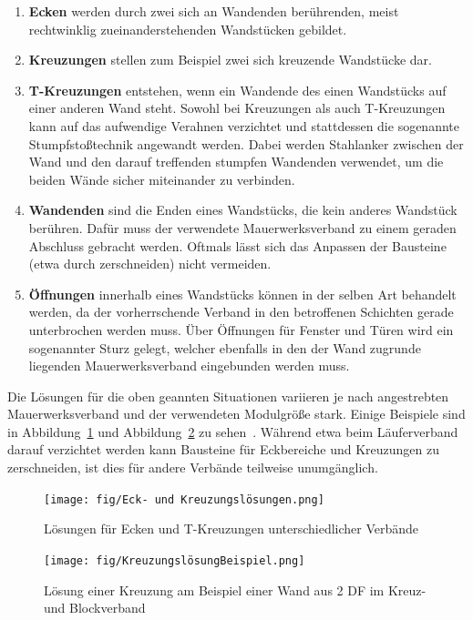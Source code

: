 \begin{enumerate}
  \item \textbf{Ecken} werden durch zwei sich an Wandenden berührenden, meist rechtwinklig zueinanderstehenden Wandstücken gebildet.
  \item \textbf{Kreuzungen} stellen zum Beispiel zwei sich kreuzende Wandstücke dar.
  \item \textbf{T-Kreuzungen} entstehen, wenn ein Wandende des einen Wandstücks auf einer anderen Wand steht.
  Sowohl bei Kreuzungen als auch T-Kreuzungen kann auf das aufwendige Verahnen verzichtet und stattdessen die sogenannte Stumpfstoßtechnik angewandt werden.
  Dabei werden Stahlanker zwischen der Wand und den darauf treffenden \glqq{}stumpfen\grqq{} Wandenden verwendet, um die beiden Wände sicher miteinander zu verbinden.
  \item \textbf{Wandenden} sind die \glqq{}Enden\grqq{} eines Wandstücks, die kein anderes Wandstück berühren.
  Dafür muss der verwendete Mauerwerksverband zu einem geraden Abschluss gebracht werden.
  Oftmals lässt sich das Anpassen der Bausteine (etwa durch zerschneiden) nicht vermeiden.
  \item \textbf{Öffnungen} innerhalb eines Wandstücks können in der selben Art behandelt werden, da der vorherrschende Verband in den betroffenen Schichten gerade unterbrochen werden muss.
  Über Öffnungen für Fenster und Türen wird ein sogenannter Sturz gelegt, welcher ebenfalls in den der Wand zugrunde liegenden Mauerwerksverband eingebunden werden muss.  
\end{enumerate}

Die Lösungen für die oben geannten Situationen variieren je nach angestrebten Mauerwerksverband und der verwendeten Modulgröße stark.
Einige Beispiele sind in Abbildung~\ref{fig:basics:mauerwerk_eckloesung} und Abbildung~\ref{fig:basics:Kreuzungsloesung} zu sehen~\cite{Moro2021}\cite{MaurerfibelKreuzungen:online}.
Während etwa beim Läuferverband darauf verzichtet werden kann Bausteine für Eckbereiche und Kreuzungen zu zerschneiden, ist dies für andere Verbände teilweise unumgänglich. 

\begin{figure}[ht]
  \centering
  \texttt{[image: fig/Eck- und Kreuzungslösungen.png]}
  \caption{Lösungen für Ecken und T-Kreuzungen unterschiedlicher Verbände~\cite{Moro2021}}
  \label{fig:basics:mauerwerk_eckloesung}
\end{figure}

\begin{figure}[ht]
  \centering
  \texttt{[image: fig/KreuzungslösungBeispiel.png]}
  \caption{Lösung einer Kreuzung am Beispiel einer \glqq{}Wand aus 2 DF im Kreuz- und Blockverband\grqq{}~\cite{MaurerfibelKreuzungen:online}}
  \label{fig:basics:Kreuzungsloesung}
\end{figure}

